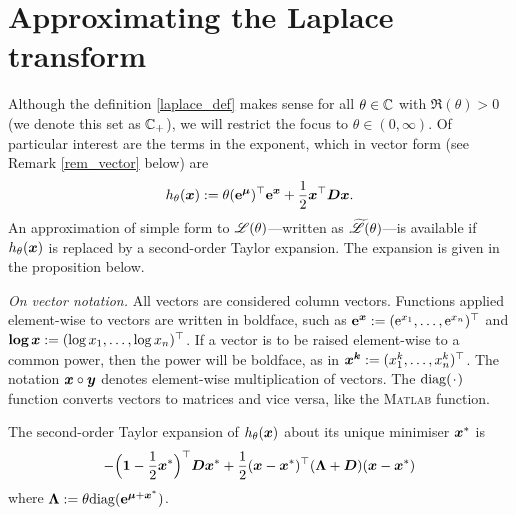 \section{Approximating the Laplace transform}\label{S:ApprL}

Although the definition \eqref{laplace_def} makes sense for all $\theta \in
\mathbb{C}$ with $\Re(\theta) > 0$ (we denote this set as $\mathbb{C}_{+}$), we will
restrict the focus to $\theta \in (0, \infty)$. Of particular interest are the
terms in the exponent, which in vector form (see Remark \ref{rem_vector}
below) are
\[ h_\theta(\bm{x}) := \theta (\text{\bf{e}}^{\bm{\mu}})^\top \text{\bf{e}}^{\bm{x}} + \frac12 \bm{x}^\top \bm{D} \bm{x}. \]
An approximation of simple form to $\mathscr{L}(\theta)$---written as
$\widetilde{\mathscr{L}}(\theta)$---is available if $h_\theta(\bm{x})$ is replaced
by a second-order Taylor expansion. The expansion is given in the proposition
below.

\begin{remark}\emph{On vector notation.} \label{rem_vector}
All vectors are considered column vectors. Functions applied element-wise to
vectors are written in boldface, such as $\text{\bf{e}}^{\bm{x}} := (\mathrm{e}^{x_1}, \dots,
\mathrm{e}^{x_n})^\top$ and $\text{\bf{log}}\, \bm{x} := (\log x_1, \dots , \log
x_n)^\top$. If a vector is to be raised element-wise to a common power, then the
power will be boldface, as in $\bm{x}^{\bm{k}} := (x_1^k, \dots ,
x_n^k)^\top$.  The notation $\bm{x} \circ \bm{y}$ denotes element-wise
multiplication of vectors. The $\diag(\argdot)$ function converts vectors to
matrices and vice versa, like the \textsc{Matlab} function. \remQED
\end{remark}

\begin{proposition}\label{P:htheta}
The second-order Taylor expansion of $h_\theta(\bm{x})$ about its unique minimiser $\bm{x}^*$ is
\[ - \Bigl(\bm{1} - \frac12 \bm{x}^* \Bigr)^\top \bm{D} \bm{x}^*
 + \frac12 (\bm{x} - \bm{x}^*)^\top (\bm{\Lambda} + \bm{D}) (\bm{x} - \bm{x}^*) \]
where $\bm{\Lambda} := \theta  \mathrm{diag}(\text{\bf{e}}^{\bm{\mu} + \bm{x}^*})$.
\end{proposition}

